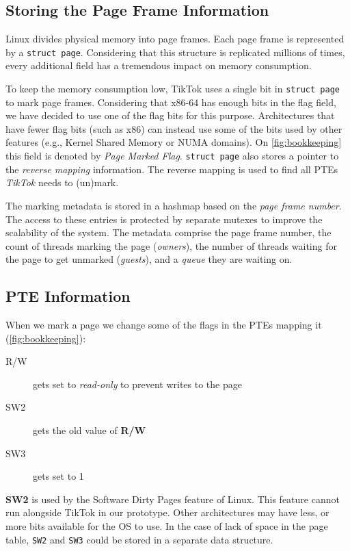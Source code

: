 \subsection{Storing the Page Frame Information}
\label{subsec:frameinfo}
Linux divides physical memory into page frames. Each page frame is represented
by a \texttt{struct page}. Considering that this structure is replicated
millions of times, every additional field has a tremendous impact on memory
consumption.

To keep the memory consumption low, TikTok uses a single bit in \texttt{struct
page} to mark page frames. Considering that x86-64 has enough bits in the flag
field, we have decided to use one of the flag bits for this purpose.
Architectures that have fewer flag bits (such as x86) can instead use some of
the bits used by other features (e.g., Kernel Shared Memory or NUMA domains). On
\cref{fig:bookkeeping} this field is denoted by \emph{Page Marked Flag}.
\texttt{struct page} also stores a pointer to the \emph{reverse mapping}
information. The reverse mapping is used to find all PTEs \emph{TikTok} needs to
(un)mark.

The marking metadata is stored in a hashmap based on the \emph{page frame
number}. The access to these entries is protected by separate mutexes to improve
the scalability of the system. The metadata comprise the page frame number, the
count of threads marking the page (\emph{owners}), the number of threads waiting
for the page to get unmarked (\emph{guests}), and a \emph{queue} they are
waiting on. 

\subsection{PTE Information}
\label{subsec:pageinfo}

When we mark a page we change some of the flags in the PTEs mapping it
(\cref{fig:bookkeeping}):

\begin{description}
  \item[R/W] gets set to \emph{read-only} to prevent writes to the page
  \item[SW2] gets the old value of \textbf{R/W}
  \item[SW3] gets set to 1 
\end{description}

\textbf{SW2} is used by the Software Dirty Pages
feature of Linux. This feature cannot run alongside TikTok in our prototype.
Other architectures may have less, or more bits available for the OS to use. In
the case of lack of space in the page table, \texttt{SW2} and \texttt{SW3} could
be stored in a separate data structure.

